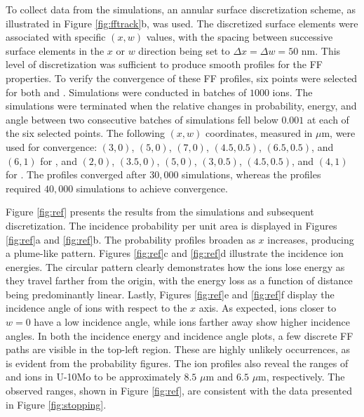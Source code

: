 \documentclass[review]{elsarticle}
\newcommand{\Y}{\ce{_{39}^{97}Y}\xspace}
\newcommand{\I}{\ce{_{53}^{136}I}\xspace}
\begin{document}
To collect data from the simulations, an annular surface discretization scheme, as illustrated in Figure \ref{fig:fftrack}b, was used. The discretized surface elements were associated with specific $(x, w)$ values, with the spacing between successive surface elements in the $x$ or $w$ direction being set to $\Delta x = \Delta w = 50$ nm. This level of discretization was sufficient to produce smooth profiles for the FF properties. To verify the convergence of these FF profiles, six points were selected for both \Y and \I. Simulations were conducted in batches of $1000$ ions. The simulations were terminated when the relative changes in probability, energy, and angle between two consecutive batches of simulations fell below $0.001$ at each of the six selected points. The following $(x, w)$ coordinates, measured in $\mu$m, were used for convergence: $(3, 0)$, $(5, 0)$, $(7, 0)$, $(4.5, 0.5)$, $(6.5, 0.5)$, and $(6, 1)$ for \Y, and $(2, 0)$, $(3.5, 0)$, $(5, 0)$, $(3, 0.5)$, $(4.5, 0.5)$, and $(4, 1)$ for \I. The \Y profiles converged after $30,000$ simulations, whereas the \I profiles required $40,000$ simulations to achieve convergence.

Figure \ref{fig:ref} presents the results from the simulations and subsequent discretization. The incidence probability per unit area is displayed in Figures \ref{fig:ref}a and \ref{fig:ref}b. The probability profiles broaden as $x$ increases, producing a plume-like pattern. Figures \ref{fig:ref}c and \ref{fig:ref}d illustrate the incidence ion energies. The circular pattern clearly demonstrates how the ions lose energy as they travel farther from the origin, with the energy loss as a function of distance being predominantly linear. Lastly, Figures \ref{fig:ref}e and \ref{fig:ref}f display the incidence angle of ions with respect to the $x$ axis. As expected, ions closer to $w = 0$ have a low incidence angle, while ions farther away show higher incidence angles. In both the incidence energy and incidence angle plots, a few discrete FF paths are visible in the top-left region. These are highly unlikely occurrences, as is evident from the probability figures. The ion profiles also reveal the ranges of \Y and \I ions in U-10Mo to be approximately $8.5$ $\mu$m and $6.5$ $\mu$m, respectively. The observed ranges, shown in Figure \ref{fig:ref}, are consistent with the data presented in Figure \ref{fig:stopping}.
\end{document}
